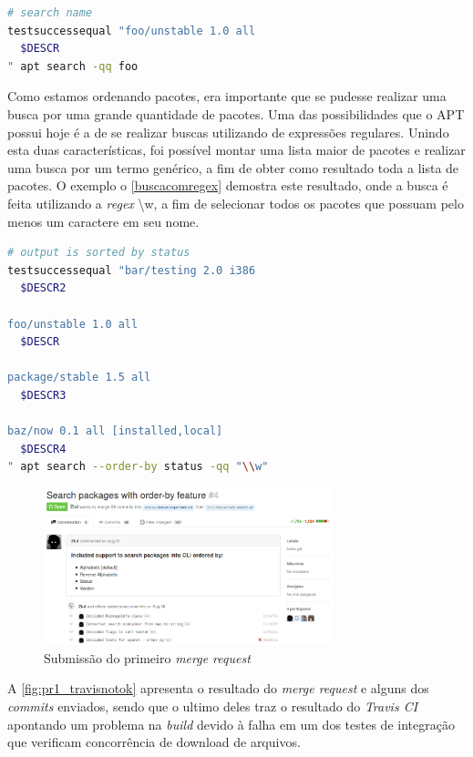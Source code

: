 \begin{lstlisting}[language=Bash,label=gtest_foo,caption={Teste de busca pelo pacote \textit{foo}}]
# search name
testsuccessequal "foo/unstable 1.0 all
  $DESCR
" apt search -qq foo
\end{lstlisting}

Como estamos ordenando pacotes, era importante que se pudesse realizar uma busca por uma grande quantidade de pacotes. Uma das possibilidades que o {\code APT} possui hoje é a de se realizar buscas utilizando de expressões regulares. Unindo esta duas características, foi possível montar uma lista maior de pacotes e realizar uma busca por um termo genérico, a fim de obter como resultado toda a lista de pacotes. O exemplo o \autoref{buscacomregex} demostra este resultado, onde a busca é feita utilizando a \textit{regex} {\code \textbackslash w}, a fim de selecionar todos os pacotes que possuam pelo menos um caractere em seu nome.

\begin{lstlisting}[language=Bash,label=buscacomregex,caption={Busca com uso de expressão regular}]
# output is sorted by status
testsuccessequal "bar/testing 2.0 i386
  $DESCR2

foo/unstable 1.0 all
  $DESCR

package/stable 1.5 all
  $DESCR3

baz/now 0.1 all [installed,local]
  $DESCR4
" apt search --order-by status -qq "\\w"
\end{lstlisting}

\begin{figure}[h]
  \centering
	\includegraphics[width=0.75\textwidth]{figuras/pr1}
  \caption{Submissão do primeiro \textit{merge request}}
  \label{fig:pr1_travisnotok}
\end{figure}

A \autoref{fig:pr1_travisnotok} apresenta o resultado do \textit{merge request} e alguns dos \textit{commits} enviados, sendo que o ultimo deles traz o resultado do \textit{Travis CI} apontando um problema na \textit{build} devido à falha em um dos testes de integração que verificam concorrência de download de arquivos.

